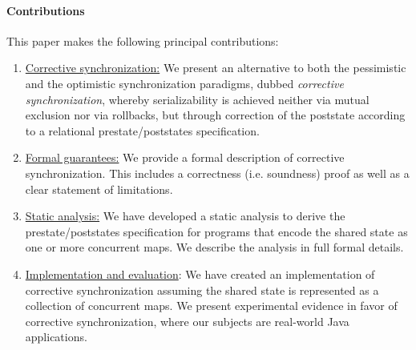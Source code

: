 \paragraph{Contributions} This paper makes the following principal contributions:
\begin{enumerate}
	\item \underline{Corrective synchronization:} We present an alternative to both the pessimistic and the optimistic synchronization paradigms, dubbed \emph{corrective synchronization}, whereby serializability is achieved neither via mutual exclusion nor via rollbacks, but through correction of the poststate according to a relational prestate/poststates specification.
	\item \underline{Formal guarantees:} We provide a formal description of corrective synchronization. This includes a correctness (i.e. soundness) proof as well as a clear statement of limitations.
	\item \underline{Static analysis:} We have developed a static analysis to derive the prestate/poststates specification for programs that encode the shared state as one or more concurrent maps. We describe the analysis in full formal details.
	\item \underline{Implementation and evaluation}: We have created an implementation of corrective synchronization assuming the shared state is represented as a collection of concurrent maps. We present experimental evidence in favor of corrective synchronization, where our subjects are real-world Java applications.
\end{enumerate}